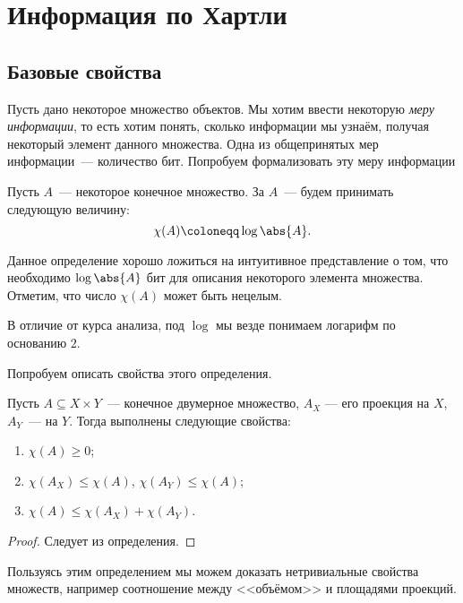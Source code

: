 \section{Информация по Хартли}

\subsection{Базовые свойства}

Пусть дано некоторое множество объектов. Мы хотим ввести некоторую \textit{меру информации}, то есть
хотим понять, сколько информации мы узнаём, получая некоторый элемент данного множества. Одна из
общепринятых мер информации~--- количество бит. Попробуем формализовать эту меру информации

\begin{definition}
    \label{def:hartley-inf}
	Пусть $A$~--- некоторое конечное множество. За  $A$~--- будем
    принимать следующую величину:
	$$
        \chi(A) \coloneqq \log{\abs{A}}.
    $$
\end{definition}

Данное определение хорошо ложиться на интуитивное представление о том, что необходимо $\log{\abs{A}}$ бит
для описания некоторого элемента множества. Отметим, что число $\chi(A)$ может быть нецелым.
\begin{remark}
	В отличие от курса анализа, под $\log$ мы везде понимаем логарифм по основанию $2$.
\end{remark}

Попробуем описать свойства этого определения.

\begin{proposition}
    Пусть $A \subseteq X \times Y$~--- конечное двумерное множество, $A_X$ --- его проекция на $X$,
    $A_Y$~--- на $Y$. Тогда выполнены следующие свойства: 
	\begin{enumerate}
        \item $\chi(A) \ge 0$;
        \item $\chi(A_X) \le \chi(A)$, $\chi(A_Y) \le \chi(A)$;
        \item $\chi(A) \le \chi(A_X) + \chi(A_Y)$.
    \end{enumerate}
\end{proposition}

\begin{proof}
	Следует из определения.
\end{proof}

Пользуясь этим определением мы можем доказать нетривиальные свойства множеств, например соотношение между
<<объёмом>> и площадями проекций.


